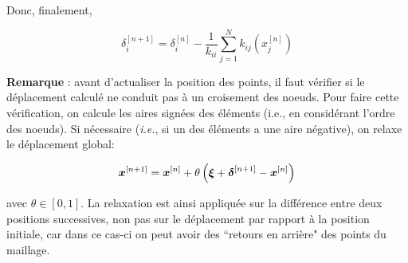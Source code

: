 \indent Donc, finalement,

\begin{equation*}
	\delta_i^{[n+1]} =  \delta_i^{[n]} -\frac{1}{k_{ii}} \sum_{j=1}^N k_{ij}(x_j^{[n]})
\end{equation*}

\indent \textbf{Remarque} : avant d'actualiser la position des points, il faut vérifier si le déplacement calculé ne conduit pas à un croisement des noeuds. Pour faire cette vérification, on calcule les aires signées des éléments (i.e., en considérant l'ordre des noeuds). Si nécessaire (\emph{i.e.}, si un des éléments a une aire négative), on relaxe le déplacement global: 


\begin{equation*}
	\boldsymbol{x}^{[n+1]} = \boldsymbol{x}^{[n]} + \theta \left( \boldsymbol{\xi} + \boldsymbol{\delta}^{[n+1]} - \boldsymbol{x}^{[n]} \right)
\end{equation*} 

\noindent avec \(\theta \in [0,1]\). La relaxation est ainsi appliquée sur la différence entre deux positions successives, non pas sur le déplacement par rapport à la position initiale, car dans ce cas-ci on peut avoir des ``retours en arrière" des points du maillage.
